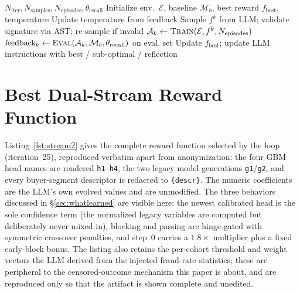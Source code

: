 \documentclass[11pt]{article}
\begin{document}
\begin{algorithm}[t]
\caption{LLM-based Dual-Stream Reward Optimization}
\label{alg:LLM-RL}
{\footnotesize
\begin{algorithmic}[1]
\REQUIRE $N_\text{iter}, N_\text{samples}, N_\text{episodes}, \theta_\text{recall}$
\STATE Initialize env.\ $\mathcal{E}$, baseline $\mathcal{M}_b$, best reward $f_\text{best}$, temperature
  \STATE Update temperature from feedback
    \STATE Sample $f^k$ from LLM; validate signature via AST; re-sample if invalid
  \ENDFOR
    \STATE $\mathcal{A}_k \leftarrow \textsc{Train}(\mathcal{E}, f^k, N_\text{episodes})$ 
    \STATE $\text{feedback}_k \leftarrow \textsc{Eval}(\mathcal{A}_k, \mathcal{M}_b, \theta_\text{recall})$ on eval. set
  \ENDFOR
  \STATE Update $f_\text{best}$; update LLM instructions with best / sub-optimal / reflection
\ENDFOR
\end{algorithmic}}
\end{algorithm}

\section{Best Dual-Stream Reward Function}
\label{appendix:reward}
Listing~\ref{lst:stream2} gives the complete reward function selected by the loop
(iteration~25), reproduced verbatim apart from anonymization: the four GBM head names are
rendered \texttt{h1}--\texttt{h4}, the two legacy model generations \texttt{g1}/\texttt{g2},
and every buyer-segment descriptor is redacted to \texttt{\{descr\}}. The numeric coefficients
are the LLM's own evolved values and are unmodified. The three behaviors discussed in
\S\ref{sec:whatlearned} are visible here: the newest calibrated head is the sole confidence term
(the normalized legacy variables are computed but deliberately never mixed in), blocking and
passing are hinge-gated with symmetric crossover penalties, and step~0 carries a $1.8\times$
multiplier plus a fixed early-block bonus. The listing also retains the per-cohort threshold and
weight vectors the LLM derived from the injected fraud-rate statistics; these are peripheral to
the censored-outcome mechanism this paper is about, and are reproduced only so that the artifact
is shown complete and unedited.
\end{document}
